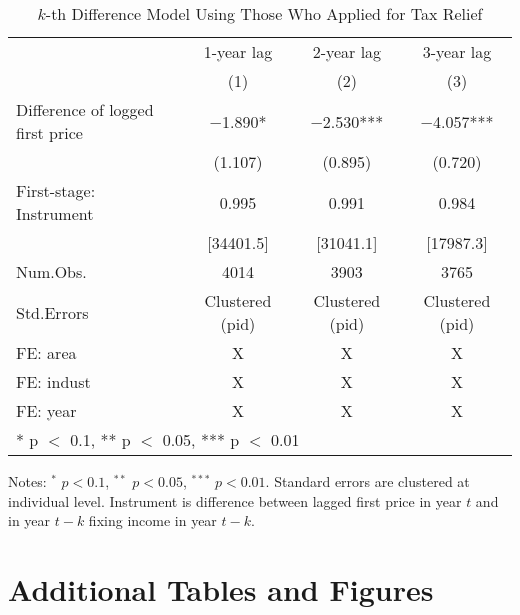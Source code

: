 \documentclass[
  11pt,
  a4paper,
]{article}
\begin{document}
\begin{table}

\caption{\label{tab:KdiffElasticity}$k$-th Difference Model Using Those Who Applied for Tax Relief}
\centering
\fontsize{8}{10}\selectfont
\begin{threeparttable}
\begin{tabular}[t]{lccc}
\toprule
\multicolumn{1}{c}{ } & \multicolumn{1}{c}{1-year lag} & \multicolumn{1}{c}{2-year lag} & \multicolumn{1}{c}{3-year lag} \\
\cmidrule(l{3pt}r{3pt}){2-2} \cmidrule(l{3pt}r{3pt}){3-3} \cmidrule(l{3pt}r{3pt}){4-4}
  & (1) & (2) & (3)\\
\midrule
Difference of logged first price & \num{-1.890}* & \num{-2.530}*** & \num{-4.057}***\\
 & (\num{1.107}) & (\num{0.895}) & (\num{0.720})\\
\midrule
First-stage: Instrument & 0.995 & 0.991 & 0.984\\
 & {}[34401.5] & {}[31041.1] & {}[17987.3]\\
Num.Obs. & \num{4014} & \num{3903} & \num{3765}\\
Std.Errors & Clustered (pid) & Clustered (pid) & Clustered (pid)\\
FE: area & X & X & X\\
FE: indust & X & X & X\\
FE: year & X & X & X\\
\bottomrule
\multicolumn{4}{l}{\rule{0pt}{1em}* p $<$ 0.1, ** p $<$ 0.05, *** p $<$ 0.01}\\
\end{tabular}
\begin{tablenotes}
\item Notes: $^{*}$ $p < 0.1$, $^{**}$ $p < 0.05$, $^{***}$ $p < 0.01$. Standard errors are clustered at individual level. Instrument is difference between lagged first price in year $t$ and in year $t - k$ fixing income in year $t - k$.
\end{tablenotes}
\end{threeparttable}
\end{table}

\newpage

\hypertarget{appendix-appendix}{%
\appendix}


\hypertarget{addtab}{%
\section{Additional Tables and Figures}\label{addtab}}
\end{document}
